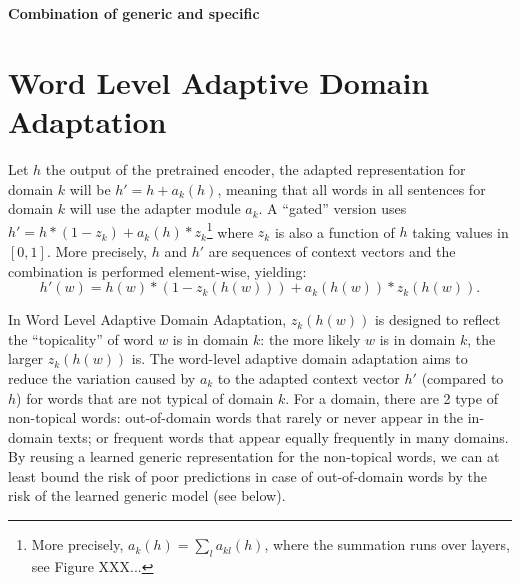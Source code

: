 \documentclass[12pt,a4paper,twoside]{report}
\theoremstyle{definition}
\newcommand{\fyTodo}[1]{\Todo[FY:]{\textcolor{orange}{#1}}}
\begin{document}
\begin{center}
{\LARGE \bf Combination of generic and specific}\\
\end{center}
\setlength{\belowdisplayskip}{8pt} \setlength{\belowdisplayshortskip}{8pt}
\setlength{\abovedisplayskip}{8pt} \setlength{\abovedisplayshortskip}{8pt}
\setlength{\parskip}{0.1cm}
\setlength{\parindent}{1em}
\section*{Word Level Adaptive Domain Adaptation}
Let $h$ the output of the pretrained encoder, the adapted representation for domain $k$ will be $h' = h + a_k(h)$, meaning that all words in all sentences for domain $k$ will use the adapter module $a_k$.  A ``gated'' version uses $h' = h * (1-z_k) + a_k(h) * z_k$\footnote{More precisely, $a_k(h) = \sum_{l} a_{kl}(h)$, where the summation runs over layers, see Figure XXX...}\fyTodo{$a_k(h)=$ somme tous les composants résiduels} where $z_k$ is also a function of $h$ taking values in $[0,1]$. More precisely, $h$ and $h'$ are sequences of context vectors and the combination is performed element-wise, yielding:
\begin{equation}
  h'(w) = h(w) * (1 - z_k(h(w))) + a_k(h(w)) * z_k(h(w)). \label{eq:gated-residual}
\end{equation}

In Word Level Adaptive Domain Adaptation, $z_k(h(w))$ is designed to reflect the ``topicality'' of  word $w$ is in domain $k$: the more likely $w$ is in domain $k$, the larger $z_k(h(w))$ is. The word-level adaptive domain adaptation aims to reduce the variation caused by $a_k$ to the adapted context vector $h'$ (compared to $h$) for words that are not typical of domain $k$. For a domain, there are 2 type of non-topical words: out-of-domain words that rarely or never appear in the in-domain texts; or frequent words that appear equally frequently in many domains. \fyTodo{This is like a poor Tf-idf - can be because tf is small or because idf is small} By reusing a learned generic representation for the non-topical words, we can at least bound the risk of poor predictions in case of out-of-domain words by the risk of the learned generic model (see below).
\end{document}
